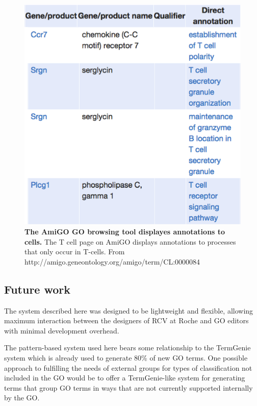 \documentclass[runningheads,a4paper]{llncs}
\begin{document}
{{\begin{figure}
\centering
\includegraphics[scale=0.40]{amigo.png}
\caption{\textbf{The AmiGO \ac{GO} browsing tool displayes annotations to cells.}  The  T cell page on AmiGO displays annotations to processes that only occur in T-cells.  From http://amigo.geneontology.org/amigo/term/CL:0000084}
\label{fig:amigo}
\end{figure}

\subsection{Future work}

The system described here was designed to be lightweight and flexible, allowing maximum interaction between the designers of RCV at Roche and \ac{GO} editors with minimal development overhead.

The pattern-based system used here bears some relationship to the TermGenie system \cite{Dietze2014} which is already used to generate 80\% of new \ac{GO} terms.  One possible approach to fulfilling the needs of external groups for types of classification not included in the \ac{GO} would be to offer a TermGenie-like system for generating terms that group \ac{GO} terms in ways that are not currently supported internally by the \ac{GO}.



}}
\end{document}
